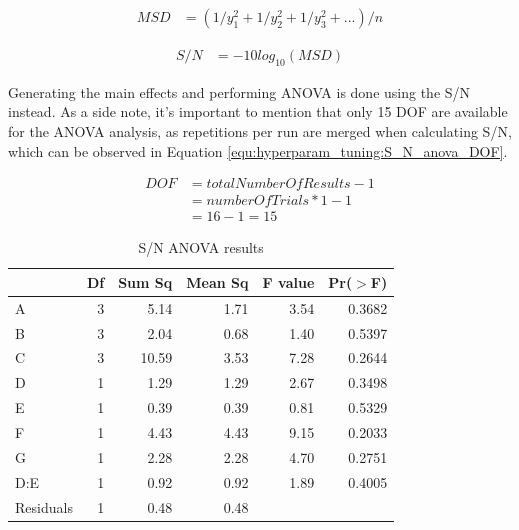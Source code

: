 \begin{equation}
	\begin{split}
		MSD & = (1/y^2_1 + 1/y^2_2 + 1/y^2_3 + ... ) / n
	\end{split}
	 \label{equ:hyperparam_tuning:MSD}
\end{equation}

\begin{equation}
	\begin{split}
		S/N & = -10 log_{10} (MSD)
	\end{split}
	 \label{equ:hyperparam_tuning:S_N}
\end{equation}

Generating the main effects and performing ANOVA is done using the S/N instead. As a side note, it's important to mention that only 15 DOF are available for the ANOVA analysis, as repetitions per run are merged when calculating S/N, which can be observed in Equation \ref{equ:hyperparam_tuning:S_N_anova_DOF}.

\begin{equation}
	\begin{split}
		DOF & = totalNumberOfResults - 1 \\
		& = numberOfTrials * 1 - 1 \\
		& = 16 - 1 = 15
	\end{split}
	 \label{equ:hyperparam_tuning:S_N_anova_DOF}
\end{equation}

\begin{table}[ht]
	\centering
	\begin{tabular}{lrrrrr}
		\hline
		& Df & Sum Sq & Mean Sq & F value & Pr($>$F) \\ 
		\hline
		A & 3 & 5.14 & 1.71 & 3.54 & 0.3682 \\ 
		B & 3 & 2.04 & 0.68 & 1.40 & 0.5397 \\ 
		C & 3 & 10.59 & 3.53 & 7.28 & 0.2644 \\ 
		D & 1 & 1.29 & 1.29 & 2.67 & 0.3498 \\ 
		E & 1 & 0.39 & 0.39 & 0.81 & 0.5329 \\ 
		F & 1 & 4.43 & 4.43 & 9.15 & 0.2033 \\ 
		G & 1 & 2.28 & 2.28 & 4.70 & 0.2751 \\ 
		D:E & 1 & 0.92 & 0.92 & 1.89 & 0.4005 \\ 
		Residuals & 1 & 0.48 & 0.48 &  &  \\ 
		\hline
	\end{tabular}
	\caption{S/N ANOVA results}
	\label{tab:hyperparameter_tuning:s_n_anova_results}
\end{table}

